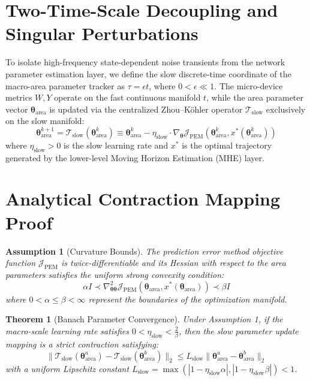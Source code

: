 \documentclass[10pt,journal,compsoc]{IEEEtran}
\newtheorem{theorem}{Theorem}
\newtheorem{assumption}{Assumption}
\begin{document}
\section{Two-Time-Scale Decoupling and Singular Perturbations}
To isolate high-frequency state-dependent noise transients from the network parameter estimation layer, we define the slow discrete-time coordinate of the macro-area parameter tracker as $\tau = \epsilon t$, where $0 < \epsilon \ll 1$. The micro-device metrics $W, Y$ operate on the fast continuous manifold $t$, while the area parameter vector $\bm{\theta}_{\text{area}}$ is updated via the centralized Zhou--K\"ohler operator $\mathcal{T}_{\text{slow}}$ exclusively on the slow manifold:
\begin{equation}
    \bm{\theta}_{\text{area}}^{k+1} = \mathcal{T}_{\text{slow}}(\bm{\theta}_{\text{area}}^k) \equiv \bm{\theta}_{\text{area}}^k - \eta_{\text{slow}} \cdot \nabla_{\bm{\theta}} \mathcal{J}_{\text{PEM}}(\bm{\theta}_{\text{area}}^k, x^*(\bm{\theta}_{\text{area}}^k))
\end{equation}
where $\eta_{\text{slow}} > 0$ is the slow learning rate and $x^*$ is the optimal trajectory generated by the lower-level Moving Horizon Estimation (MHE) layer.

\section{Analytical Contraction Mapping Proof}
\begin{assumption}[Curvature Bounds]
The prediction error method objective function $\mathcal{J}_{\text{PEM}}$ is twice-differentiable and its Hessian with respect to the area parameters satisfies the uniform strong convexity condition:
\begin{equation}
    \alpha I \bm{\prec} \nabla^2_{\bm{\theta}\bm{\theta}} \mathcal{J}_{\text{PEM}}(\bm{\theta}_{\text{area}}, x^*(\bm{\theta}_{\text{area}})) \bm{\prec} \beta I
\end{equation}
where $0 < \alpha \le \beta < \infty$ represent the boundaries of the optimization manifold.
\end{assumption}

\begin{theorem}[Banach Parameter Convergence]
Under Assumption 1, if the macro-scale learning rate satisfies $0 < \eta_{\text{slow}} < \frac{2}{\beta}$, then the slow parameter update mapping is a strict contraction satisfying:
\begin{equation}
    \|\mathcal{T}_{\text{slow}}(\bm{\theta}_{\text{area}}^a) - \mathcal{T}_{\text{slow}}(\bm{\theta}_{\text{area}}^b)\|_2 \le L_{\text{slow}} \|\bm{\theta}_{\text{area}}^a - \bm{\theta}_{\text{area}}^b\|_2
\end{equation}
with a uniform Lipschitz constant $L_{\text{slow}} = \max(|1 - \eta_{\text{slow}}\alpha|, |1 - \eta_{\text{slow}}\beta|) < 1$.
\end{theorem}
\end{document}
